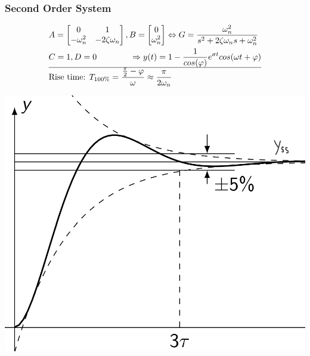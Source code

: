     \subsubsection{Second Order System}
        \begin{align*}
            &A = \left[\begin{matrix}
                0 & 1\\
                -\omega_n^2 & -2 \zeta \omega_n
            \end{matrix}\right],
            B = \left[\begin{matrix}
                0\\
                \omega_n^2
            \end{matrix}\right] \Leftrightarrow G = \frac{\omega_n^2}{s^2 + 2 \zeta \omega_n s + \omega_n^2}\\
            &C = 1, D = 0 \quad \quad \quad \quad \Rightarrow y(t) = 1 - \frac{1}{cos(\varphi)}e^{\sigma t} cos(\omega t + \varphi)\\
            \hline
            &\text{Rise time: } T_{100 \%} = \frac{\frac{\pi}{2} - \varphi}{\omega} \approx \frac{\pi}{2 \omega_n}
        \end{align*}
        \begin{minipage}{0.49\linewidth}
            \includegraphics[width = \linewidth]{src/images/second_order_step_response.png}
        \end{minipage}
